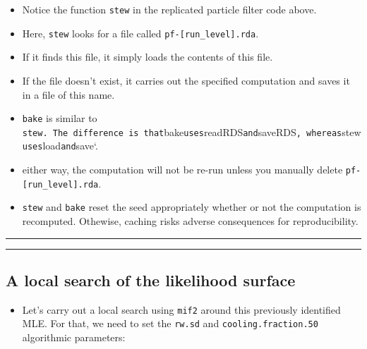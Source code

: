 \documentclass[]{article}
\providecommand{\tightlist}{%
  \setlength{\itemsep}{0pt}\setlength{\parskip}{0pt}}
\begin{document}
\begin{itemize}
\item
  Notice the function \texttt{stew} in the replicated particle filter
  code above.
\item
  Here, \texttt{stew} looks for a file called
  \texttt{pf-{[}run\_level{]}.rda}.
\item
  If it finds this file, it simply loads the contents of this file.
\item
  If the file doesn't exist, it carries out the specified computation
  and saves it in a file of this name.
\item
  \texttt{bake} is similar to
  \texttt{stew.\ The\ difference\ is\ that}bake\texttt{uses}readRDS\texttt{and}saveRDS\texttt{,\ whereas}stew\texttt{uses}load\texttt{and}save`.
\item
  either way, the computation will not be re-run unless you manually
  delete \texttt{pf-{[}run\_level{]}.rda}.
\item
  \texttt{stew} and \texttt{bake} reset the seed appropriately whether
  or not the computation is recomputed. Othewise, caching risks adverse
  consequences for reproducibility.
\end{itemize}

\begin{center}\rule{0.5\linewidth}{\linethickness}\end{center}

\begin{center}\rule{0.5\linewidth}{\linethickness}\end{center}

\subsection{A local search of the likelihood
surface}\label{a-local-search-of-the-likelihood-surface}

\begin{itemize}
\tightlist
\item
  Let's carry out a local search using \texttt{mif2} around this
  previously identified MLE. For that, we need to set the \texttt{rw.sd}
  and \texttt{cooling.fraction.50} algorithmic parameters:
\end{itemize}
\end{document}

